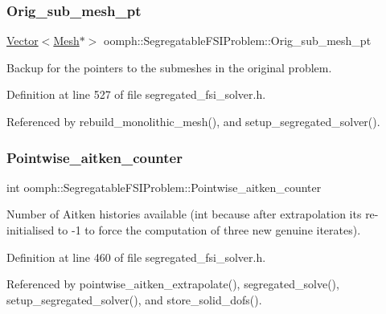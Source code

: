 \subsubsection{\texorpdfstring{Orig\+\_\+sub\+\_\+mesh\+\_\+pt}{Orig\_sub\_mesh\_pt}}
{\footnotesize\ttfamily \hyperlink{classoomph_1_1Vector}{Vector}$<$\hyperlink{classoomph_1_1Mesh}{Mesh}$\ast$$>$ oomph\+::\+Segregatable\+F\+S\+I\+Problem\+::\+Orig\+\_\+sub\+\_\+mesh\+\_\+pt\hspace{0.3cm}{\ttfamily [protected]}}



Backup for the pointers to the submeshes in the original problem. 



Definition at line 527 of file segregated\+\_\+fsi\+\_\+solver.\+h.



Referenced by rebuild\+\_\+monolithic\+\_\+mesh(), and setup\+\_\+segregated\+\_\+solver().

\mbox{\label{classoomph_1_1SegregatableFSIProblem_ad92eead7c5dc21884292a5a501c71388}} 
\subsubsection{\texorpdfstring{Pointwise\+\_\+aitken\+\_\+counter}{Pointwise\_aitken\_counter}}
{\footnotesize\ttfamily int oomph\+::\+Segregatable\+F\+S\+I\+Problem\+::\+Pointwise\+\_\+aitken\+\_\+counter\hspace{0.3cm}{\ttfamily [protected]}}



Number of Aitken histories available (int because after extrapolation it\textquotesingle{}s re-\/initialised to -\/1 to force the computation of three new genuine iterates). 



Definition at line 460 of file segregated\+\_\+fsi\+\_\+solver.\+h.



Referenced by pointwise\+\_\+aitken\+\_\+extrapolate(), segregated\+\_\+solve(), setup\+\_\+segregated\+\_\+solver(), and store\+\_\+solid\+\_\+dofs().

